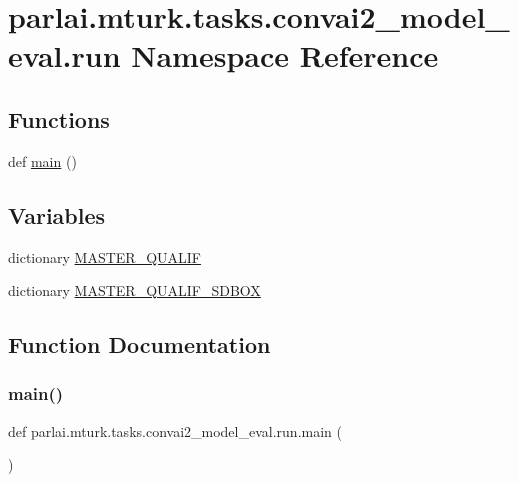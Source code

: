 \hypertarget{namespaceparlai_1_1mturk_1_1tasks_1_1convai2__model__eval_1_1run}{}\section{parlai.\+mturk.\+tasks.\+convai2\+\_\+model\+\_\+eval.\+run Namespace Reference}
\label{namespaceparlai_1_1mturk_1_1tasks_1_1convai2__model__eval_1_1run}
\subsection*{Functions}
\begin{DoxyCompactItemize}
\item 
def \hyperlink{namespaceparlai_1_1mturk_1_1tasks_1_1convai2__model__eval_1_1run_a1624989606bd5fc34368102c32217178}{main} ()
\end{DoxyCompactItemize}
\subsection*{Variables}
\begin{DoxyCompactItemize}
\item 
dictionary \hyperlink{namespaceparlai_1_1mturk_1_1tasks_1_1convai2__model__eval_1_1run_ad109e0d8716c462fd34311249d56f8a4}{M\+A\+S\+T\+E\+R\+\_\+\+Q\+U\+A\+L\+IF}
\item 
dictionary \hyperlink{namespaceparlai_1_1mturk_1_1tasks_1_1convai2__model__eval_1_1run_ae483985edefe82c63e9b78a5a7bccfb3}{M\+A\+S\+T\+E\+R\+\_\+\+Q\+U\+A\+L\+I\+F\+\_\+\+S\+D\+B\+OX}
\end{DoxyCompactItemize}


\subsection{Function Documentation}
\mbox{\label{namespaceparlai_1_1mturk_1_1tasks_1_1convai2__model__eval_1_1run_a1624989606bd5fc34368102c32217178}} 
\subsubsection{\texorpdfstring{main()}{main()}}
{\footnotesize\ttfamily def parlai.\+mturk.\+tasks.\+convai2\+\_\+model\+\_\+eval.\+run.\+main (\begin{DoxyParamCaption}{ }\end{DoxyParamCaption})}

